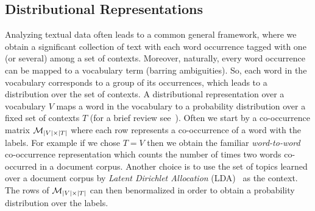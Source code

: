 \subsection{Distributional Representations}
\label{sec:distributional-representations}
Analyzing textual data often leads to a common general framework,
where we obtain a significant collection of text with each word
occurrence tagged with one (or several) among a set of
contexts. Moreover, naturally, every word occurrence can be mapped to a
vocabulary term (barring ambiguities). So, each word in the vocabulary
corresponds to a group of its occurrences, which leads to a
distribution over the set of contexts. A distributional representation
over a vocabulary $V$ maps a word in the vocabulary to a  
probability distribution over a fixed set of contexts $T$  (for a brief review
see~\cite{Turian10wordrepresentations}). Often we start by a
co-occurrence matrix ${\mathcal M}_{|V|\times|T|}$ where each row represents a
co-occurrence of a word with the labels.
For example if we chose $T=V$ then we obtain the familiar {\sl
  word-to-word} co-occurrence representation which counts the number 
of times two words co-occurred in a document corpus. Another choice is
to use the set of topics learned over a document 
corpus by {\sl Latent Dirichlet Allocation}
(LDA)~\cite{Blei:2003:LDA:944919.944937} as the context. The rows of
${\mathcal M}_{|V|\times|T|}$ 
can then  benormalized in order to obtain a probability distribution over
the labels.



